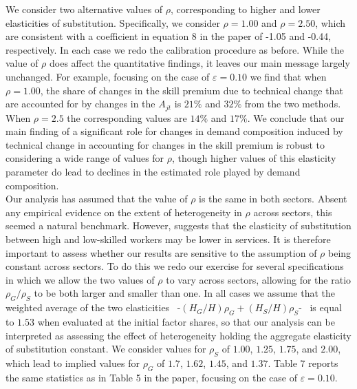 \documentclass[10pt]{article}
\begin{document}
We consider two alternative values of $\rho $, corresponding to higher and lower elasticities of substitution. Specifically, we consider $\rho =1.00$ and $\rho =2.50$, which are consistent with a coefficient in equation 8 in the paper of -1.05 and -0.44, respectively. In each case we redo the calibration procedure as before. While the value of $\rho $ does affect the quantitative findings, it leaves our main message largely unchanged. For example, focusing on the case of $\varepsilon =0.10$ we find that when $\rho =1.00$, the share of changes in the skill premium due to technical change that are accounted for by changes in the $A_{jt}$ is $21\%$ and $32\%$ from the two methods. When $\rho =2.5$ the corresponding values are $14\%$ and $17\%$. We conclude that our main finding of a significant role for changes in demand composition induced by
technical change in accounting for changes in the skill premium is robust to considering a wide range of values for $\rho $, though higher values of this elasticity parameter do lead to declines in the estimated role played by demand composition.\\

Our analysis has assumed that the value of $\rho$ is the same in both sectors. Absent any empirical evidence on the extent of heterogeneity in $\rho $ across sectors, this seemed a natural benchmark. However, \citet{Res13} suggests that the elasticity of substitution between high and
low-skilled workers may be lower in services. It is therefore important to  assess whether our results are sensitive to the assumption of $\rho$ being constant across sectors. To do this we redo our exercise for several specifications in which we allow the two values of $\rho$ to vary across sectors, allowing for the ratio $\rho_{G}/\rho_{S}$ to be both larger and smaller than one. In all cases we assume that the weighted average of the two elasticities \ -$(H_{G}/H)\rho_{G}+(H_{S}/H)\rho_{S}$- \ is equal to $1.53$ when evaluated at the initial factor shares, so that our analysis can be interpreted as assessing the effect of heterogeneity holding the aggregate elasticity of substitution constant. We consider values for $\rho_{S}$ of $1.00$, $1.25$, $1.75$, and $2.00$, which lead to implied values for $\rho_{G}$ of $1.7$, $1.62$, $1.45$, and $1.37$. Table 7 reports the same statistics as in Table 5 in the paper, focusing on the case of $\varepsilon =0.10$.
\end{document}
